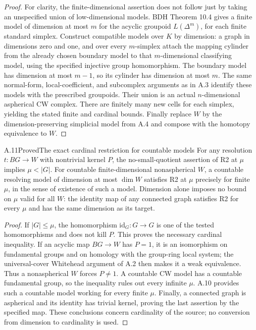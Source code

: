 \begin{proof}
For clarity, the finite-dimensional assertion does not follow just
by taking an unspecified union of low-dimensional models. BDH
Theorem 10.4 gives a finite model of dimension at most $m$ for the
acyclic groupoid $L(\Delta^m)$, for each finite standard simplex.
Construct compatible models over $K$ by dimension: a graph in
dimensions zero and one, and over every $m$-simplex attach the
mapping cylinder from the already chosen boundary model to that
$m$-dimensional classifying model, using the specified injective
group homomorphism. The boundary model has dimension at most
$m-1$, so its cylinder has dimension at most $m$. The same
normal-form, local-coefficient, and subcomplex arguments as in A.3
identify these models with the prescribed groupoids. Their union
is an actual $n$-dimensional aspherical CW complex. There are
finitely many new cells for each simplex, yielding the stated
finite and cardinal bounds. Finally replace $W$ by the
dimension-preserving simplicial model from A.4 and compose with
the homotopy equivalence to $W$.
\end{proof}

\begin{claim}{A.11}{Proved}{The exact cardinal restriction for countable models}
For any resolution $t:BG\to W$ with nontrivial kernel $P$, the
no-small-quotient assertion of R2 at $\mu$ implies $\mu<|G|$.
For countable finite-dimensional nonaspherical $W$, a countable
resolving model of dimension at most $\dim W$ satisfies R2 at
$\mu$ precisely for finite $\mu$, in the sense of existence of
such a model. Dimension alone imposes no bound on $\mu$ valid for
all $W$: the identity map of any connected graph satisfies R2 for
every $\mu$ and has the same dimension as its target.
\end{claim}
\begin{proof}
If $|G|\leq\mu$, the homomorphism $\mathrm{id}_G:G\to G$ is one
of the tested homomorphisms and does not kill $P$. This proves the
necessary cardinal inequality. If an acyclic map $BG\to W$ has
$P=1$, it is an isomorphism on fundamental groups and on homology
with the group-ring local system; the universal-cover Whitehead
argument of A.2 then makes it a weak equivalence. Thus a
nonaspherical $W$ forces $P\ne1$. A countable CW model has a
countable fundamental group, so the inequality rules out every
infinite $\mu$. A.10 provides such a countable model working for
every finite $\mu$. Finally, a connected graph is aspherical and
its identity has trivial kernel, proving the last assertion by the
specified map. These conclusions concern cardinality of the
source; no conversion from dimension to cardinality is used.
\end{proof}

